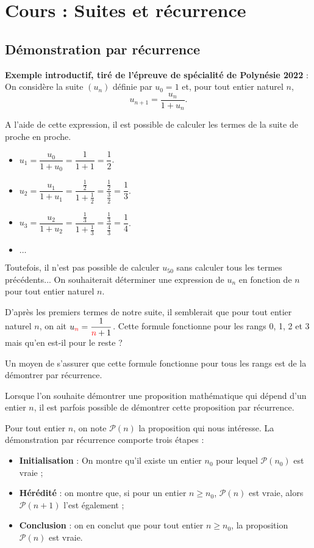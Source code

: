 \documentclass[11pt,fleqn]{book} %
\begin{document}
\chapter{Cours : Suites et récurrence}

\section{Démonstration par récurrence}

\textbf{Exemple introductif, tiré de l'épreuve de spécialité de Polynésie 2022} : On considère la suite \((u_n)\) définie par \(u_0=1\) et, pour tout entier naturel \(n\), \[u_{n+1}=\dfrac{u_n}{1+u_n}.\]

A l'aide de cette expression, il est possible de calculer les termes de la suite de proche en proche.
\begin{itemize}
\item \(u_1 = \dfrac{u_0}{1+u_0}=\dfrac{1}{1+1}=\dfrac{1}{2}\).
\vskip5pt
\item \(u_2= \dfrac{u_1}{1+u_1}=\dfrac{ \frac{1}{2}}{1+\frac{1}{2}}=\dfrac{ \frac{1}{2}}{\frac{3}{2}}=\dfrac{1}{3} \).
\vskip5pt
\item \(u_3= \dfrac{u_2}{1+u_2}=\dfrac{ \frac{1}{3}}{1+\frac{1}{3}}=\dfrac{ \frac{1}{3}}{\frac{4}{3}}=\dfrac{1}{4} \).
\vskip5pt
\item \(\ldots\)
\end{itemize}

Toutefois, il n'est pas possible de calculer \(u_{50}\) sans calculer tous les termes précédents... On souhaiterait déterminer une expression de \(u_n\) en fonction de \(n\) pour tout entier naturel \(n\).

D'après les premiers termes de notre suite, il semblerait que pour tout entier naturel \(n\), on ait \(u_{\color{red}{n}}=\dfrac{1}{\color{red}n\color{black}+1}\). Cette formule fonctionne pour les rangs 0, 1, 2 et 3 mais qu'en est-il pour le reste ? 

Un moyen de s'assurer que cette formule fonctionne pour tous les rangs est de la démontrer par récurrence.

\begin{definition}Lorsque l'on souhaite démontrer une proposition mathématique qui dépend d'un entier $n$, il est parfois possible de démontrer cette proposition par récurrence.

Pour tout entier $n$, on note $\mathcal{P}(n)$ la proposition qui nous intéresse. La démonstration par récurrence comporte trois étapes :
\begin{itemize}
\item \textbf{Initialisation} : On montre qu'il existe un entier $n_0$ pour lequel $\mathcal{P}(n_0)$ est vraie ;
\item \textbf{Hérédité} : on montre que, si pour un entier $n\geqslant n_0$, $\mathcal{P}(n)$ est vraie, alors $\mathcal{P}(n+1)$ l'est également ;
\item \textbf{Conclusion} : on en conclut que pour tout entier $n\geqslant n_0$, la proposition $\mathcal{P}(n)$ est vraie.
\end{itemize}\end{definition}
\end{document}

